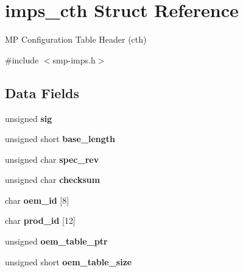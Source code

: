\hypertarget{structimps__cth}{}\section{imps\+\_\+cth Struct Reference}
\label{structimps__cth}


MP Configuration Table Header (cth)  




{\ttfamily \#include $<$smp-\/imps.\+h$>$}

\subsection*{Data Fields}
\begin{DoxyCompactItemize}
\item 
\mbox{\label{structimps__cth_a672c27091281ca93d301bc8005bb40b8}} 
unsigned {\bfseries sig}
\item 
\mbox{\label{structimps__cth_a34cce617ac6f7615e2c1969cacbdab25}} 
unsigned short {\bfseries base\+\_\+length}
\item 
\mbox{\label{structimps__cth_a1ce9bc1e367c484cea3f9acd05f23550}} 
unsigned char {\bfseries spec\+\_\+rev}
\item 
\mbox{\label{structimps__cth_a03f0d0f272c51f3a2a8e1668dc1d2387}} 
unsigned char {\bfseries checksum}
\item 
\mbox{\label{structimps__cth_ac90eecc0aa87e0cca7e3cf5907673f38}} 
char {\bfseries oem\+\_\+id} \mbox{[}8\mbox{]}
\item 
\mbox{\label{structimps__cth_a7b08cfa5db3565414eb6e1c8c7cbd948}} 
char {\bfseries prod\+\_\+id} \mbox{[}12\mbox{]}
\item 
\mbox{\label{structimps__cth_a070746110d9615ce41700554315f656d}} 
unsigned {\bfseries oem\+\_\+table\+\_\+ptr}
\item 
\mbox{\label{structimps__cth_a49e16c97ad5ea7ee4a0aed295e7e6179}} 
unsigned short {\bfseries oem\+\_\+table\+\_\+size}
\item 
\mbox{\label{structimps__cth_ad70a7a7a34de2848cbf7dbacc8fad50b}} 

\end{DoxyCompactItemize}
